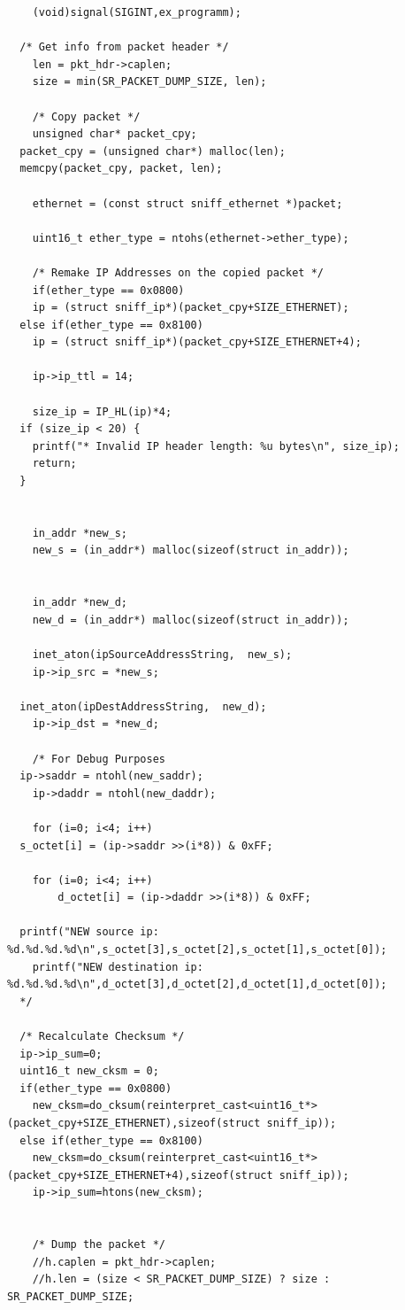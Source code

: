\documentclass[12pt,english,oneside]{book}
\begin{document}
\begin{lstlisting}
    (void)signal(SIGINT,ex_programm);
 
  /* Get info from packet header */
    len = pkt_hdr->caplen;
    size = min(SR_PACKET_DUMP_SIZE, len);
    
    /* Copy packet */
    unsigned char* packet_cpy;
  packet_cpy = (unsigned char*) malloc(len);
  memcpy(packet_cpy, packet, len);
    
    ethernet = (const struct sniff_ethernet *)packet;
    
    uint16_t ether_type = ntohs(ethernet->ether_type);
    
    /* Remake IP Addresses on the copied packet */
    if(ether_type == 0x0800)
    ip = (struct sniff_ip*)(packet_cpy+SIZE_ETHERNET);
  else if(ether_type == 0x8100)
    ip = (struct sniff_ip*)(packet_cpy+SIZE_ETHERNET+4);
    
    ip->ip_ttl = 14;
    
    size_ip = IP_HL(ip)*4;
  if (size_ip < 20) {
    printf("* Invalid IP header length: %u bytes\n", size_ip);
    return;
  }
  
    
    in_addr *new_s;
    new_s = (in_addr*) malloc(sizeof(struct in_addr));
    
    
    in_addr *new_d;
    new_d = (in_addr*) malloc(sizeof(struct in_addr));
    
    inet_aton(ipSourceAddressString,  new_s);
    ip->ip_src = *new_s;
  
  inet_aton(ipDestAddressString,  new_d);
    ip->ip_dst = *new_d;
    
    /* For Debug Purposes
  ip->saddr = ntohl(new_saddr);
    ip->daddr = ntohl(new_daddr);
    
    for (i=0; i<4; i++)
  s_octet[i] = (ip->saddr >>(i*8)) & 0xFF;

    for (i=0; i<4; i++)
        d_octet[i] = (ip->daddr >>(i*8)) & 0xFF;
        
  printf("NEW source ip: %d.%d.%d.%d\n",s_octet[3],s_octet[2],s_octet[1],s_octet[0]);
    printf("NEW destination ip: %d.%d.%d.%d\n",d_octet[3],d_octet[2],d_octet[1],d_octet[0]);
  */
  
  /* Recalculate Checksum */
  ip->ip_sum=0;
  uint16_t new_cksm = 0;
  if(ether_type == 0x0800)
    new_cksm=do_cksum(reinterpret_cast<uint16_t*>(packet_cpy+SIZE_ETHERNET),sizeof(struct sniff_ip));
  else if(ether_type == 0x8100)
    new_cksm=do_cksum(reinterpret_cast<uint16_t*>(packet_cpy+SIZE_ETHERNET+4),sizeof(struct sniff_ip));
    ip->ip_sum=htons(new_cksm);
    
    
    /* Dump the packet */    
    //h.caplen = pkt_hdr->caplen;
    //h.len = (size < SR_PACKET_DUMP_SIZE) ? size : SR_PACKET_DUMP_SIZE;
    

\end{lstlisting}
\end{document}
